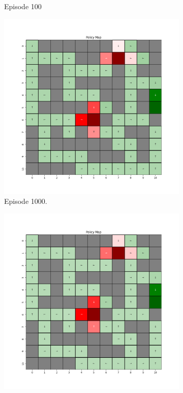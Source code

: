 \documentclass{assignment}
\begin{document}
\begin{figure}[H]
\begin{subfigure}{0.3\textwidth}
    \caption{Episode 100}
    \end{subfigure}
    \begin{subfigure}{0.3\textwidth}
        \includegraphics[width=\textwidth]{figures/policy_td/gamma_sweep/policy_alpha_0.1_gamma_0.1_epsilon_0.2_iteration_1000.png}
    \caption{Episode 1000.}
    \end{subfigure}\hfill
    \begin{subfigure}{0.3\textwidth}
        \includegraphics[width=\textwidth]{figures/policy_td/gamma_sweep/policy_alpha_0.1_gamma_0.1_epsilon_0.2_iteration_5000.png}

\end{subfigure}
\end{figure}
\end{document}
